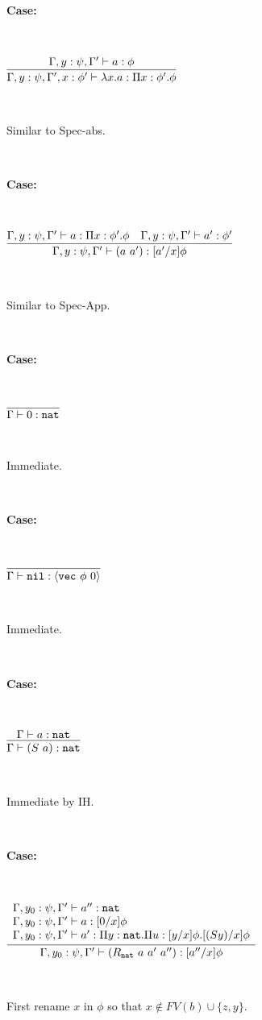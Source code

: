 \documentclass[copyright]{eptcs}
\newcommand{\vc}[0]{\texttt{vec}}
\newcommand{\nat}[0]{\texttt{nat}}
\newcommand{\nil}[0]{\texttt{nil}}
\begin{document}
\noindent \textbf{Case:}

\

$\infer{\Gamma,y:\psi,\Gamma',x:\phi' \vdash \lambda x.a : \Pi x:\phi'.\phi}
      {\Gamma,y:\psi,\Gamma' \vdash a:\phi}$

\ 

\noindent Similar to Spec-abs.

\

\noindent \textbf{Case:}

\

$\infer{\Gamma,y:\psi,\Gamma' \vdash (a\ a') : [a'/x]\phi}{\Gamma,y:\psi,\Gamma'\vdash a:\Pi x:\phi'.\phi & \Gamma,y:\psi,\Gamma'\vdash a':\phi'}$

\ 

\noindent Similar to Spec-App.

\

\noindent \textbf{Case:}

\

$\infer{\Gamma\vdash 0:\nat}{\ }$

\

\noindent Immediate.

\ 

\noindent \textbf{Case:}

\

$\infer{\Gamma\vdash \nil:\langle\vc\ \phi\ 0\rangle}{\ }$

\ 

\noindent Immediate.

\ 

\noindent \textbf{Case:}

\

$\infer{\Gamma\vdash (S\ a):\nat}{\Gamma\vdash a:\nat  }$

\ 

\noindent Immediate by IH.

\ 

\noindent \textbf{Case:}

\

$\infer{\Gamma,y_0:\psi,\Gamma'\vdash (R_\nat\ a\ a'\ a''):[a''/x]\phi}
      {\begin{array}{l}\Gamma,y_0:\psi,\Gamma' \vdash a'' : \nat \\
       \Gamma,y_0:\psi,\Gamma'\vdash a : [0/x]\phi \\
       \Gamma,y_0:\psi,\Gamma'\vdash a' : \Pi y:\nat. \Pi u : [y/x]\phi. [(S y)/x]\phi
       \end{array}}$

\ 

\noindent First rename $x$ in $\phi$ so that $x \not\in \mathit{FV}(b)\cup\{z,y\}$.
\end{document}
